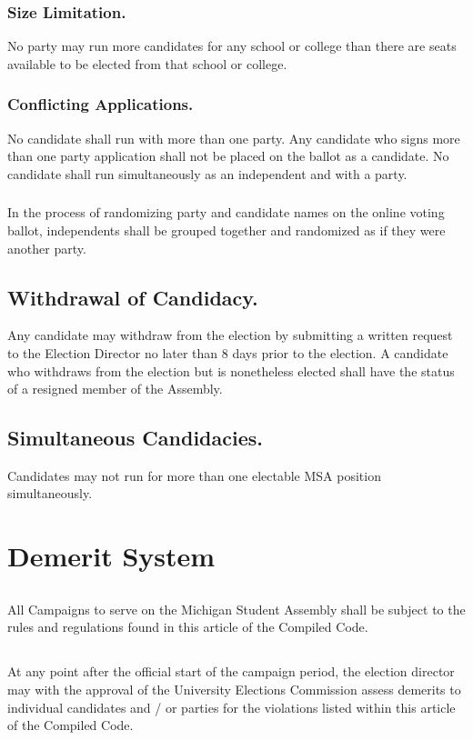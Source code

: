 \subsubsection{Size Limitation.}
No party may run more candidates for any school or college than there are seats available to be elected from that school or college.
\subsubsection{Conflicting Applications.}
No candidate shall run with more than one party.  Any candidate who signs more than one party application shall not be placed on the ballot as a candidate. No candidate shall run simultaneously as an independent and with a party.
\subsubsection{}
In the process of randomizing party and candidate names on the online voting ballot, independents shall be grouped together and randomized as if they were another party.

\subsection{Withdrawal of Candidacy.}
Any candidate may withdraw from the election by submitting a written request to the Election Director no later than 8 days prior to the election.  A candidate who withdraws from the election but is nonetheless elected shall have the status of a resigned member of the Assembly.
\subsection{Simultaneous Candidacies.}
Candidates may not run for more than one electable MSA position simultaneously.

\section{Demerit System}
\subsection{}
All Campaigns to serve on the Michigan Student Assembly shall be subject to the rules and regulations found in this article of the Compiled Code.
\subsection{}
At any point after the official start of the campaign period, the election director may with the approval of the University Elections Commission assess demerits to individual candidates and / or parties for the violations listed within this article of the Compiled Code.
